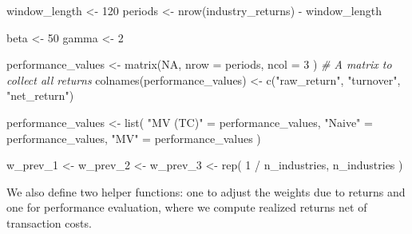 \documentclass[
]{book}
\newenvironment{Shaded}{\begin{snugshade}}{\end{snugshade}}
\newcommand{\AttributeTok}[1]{\textcolor[rgb]{0.61,0.61,0.61}{#1}}
\newcommand{\CommentTok}[1]{\textcolor[rgb]{0.37,0.37,0.37}{\textit{#1}}}
\newcommand{\ConstantTok}[1]{\textcolor[rgb]{0,0,0}{#1}}
\newcommand{\DecValTok}[1]{\textcolor[rgb]{0.06,0.06,0.06}{#1}}
\newcommand{\FunctionTok}[1]{\textcolor[rgb]{0,0,0}{#1}}
\newcommand{\NormalTok}[1]{#1}
\newcommand{\OtherTok}[1]{\textcolor[rgb]{0.37,0.37,0.37}{#1}}
\newcommand{\SpecialCharTok}[1]{\textcolor[rgb]{0,0,0}{#1}}
\newcommand{\StringTok}[1]{\textcolor[rgb]{0.5,0.5,0.5}{#1}}
\begin{document}
\begin{Shaded}
\begin{Highlighting}[]
\NormalTok{window\_length }\OtherTok{\textless{}{-}} \DecValTok{120}
\NormalTok{periods }\OtherTok{\textless{}{-}} \FunctionTok{nrow}\NormalTok{(industry\_returns) }\SpecialCharTok{{-}}\NormalTok{ window\_length}

\NormalTok{beta }\OtherTok{\textless{}{-}} \DecValTok{50}
\NormalTok{gamma }\OtherTok{\textless{}{-}} \DecValTok{2}

\NormalTok{performance\_values }\OtherTok{\textless{}{-}} \FunctionTok{matrix}\NormalTok{(}\ConstantTok{NA}\NormalTok{,}
  \AttributeTok{nrow =}\NormalTok{ periods,}
  \AttributeTok{ncol =} \DecValTok{3}
\NormalTok{) }\CommentTok{\# A matrix to collect all returns}
\FunctionTok{colnames}\NormalTok{(performance\_values) }\OtherTok{\textless{}{-}} \FunctionTok{c}\NormalTok{(}\StringTok{"raw\_return"}\NormalTok{, }\StringTok{"turnover"}\NormalTok{, }\StringTok{"net\_return"}\NormalTok{)}

\NormalTok{performance\_values }\OtherTok{\textless{}{-}} \FunctionTok{list}\NormalTok{(}
  \StringTok{"MV (TC)"} \OtherTok{=}\NormalTok{ performance\_values,}
  \StringTok{"Naive"} \OtherTok{=}\NormalTok{ performance\_values,}
  \StringTok{"MV"} \OtherTok{=}\NormalTok{ performance\_values}
\NormalTok{)}

\NormalTok{w\_prev\_1 }\OtherTok{\textless{}{-}}\NormalTok{ w\_prev\_2 }\OtherTok{\textless{}{-}}\NormalTok{ w\_prev\_3 }\OtherTok{\textless{}{-}} \FunctionTok{rep}\NormalTok{(}
  \DecValTok{1} \SpecialCharTok{/}\NormalTok{ n\_industries,}
\NormalTok{  n\_industries}
\NormalTok{)}
\end{Highlighting}
\end{Shaded}

We also define two helper functions: one to adjust the weights due to returns and one for performance evaluation, where we compute realized returns net of transaction costs.
\end{document}
